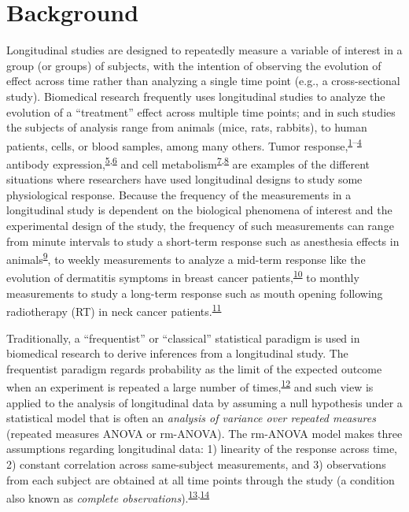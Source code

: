 \documentclass[
]{article}
\begin{document}
\hypertarget{background}{%
\section{Background}\label{background}}

Longitudinal studies are designed to repeatedly measure a variable of interest in a group (or groups) of subjects, with the intention of observing the evolution of effect across time rather than analyzing a single time point (e.g., a cross-sectional study). Biomedical research frequently uses longitudinal studies to analyze the evolution of a ``treatment'' effect across multiple time points; and in such studies the subjects of analysis range from animals (mice, rats, rabbits), to human patients, cells, or blood samples, among many others. Tumor response,\textsuperscript{\protect\hyperlink{ref-roblyer2011}{1}--\protect\hyperlink{ref-demidov2018}{4}} antibody expression,\textsuperscript{\protect\hyperlink{ref-ritter2001}{5},\protect\hyperlink{ref-roth2017}{6}} and cell metabolism\textsuperscript{\protect\hyperlink{ref-jones2018}{7},\protect\hyperlink{ref-skala2010}{8}} are examples of the different situations where researchers have used longitudinal designs to study some physiological response. Because the frequency of the measurements in a longitudinal study is dependent on the biological phenomena of interest and the experimental design of the study, the frequency of such measurements can range from minute intervals to study a short-term response such as anesthesia effects in animals\textsuperscript{\protect\hyperlink{ref-greening2018}{9}}, to weekly measurements to analyze a mid-term response like the evolution of dermatitis symptoms in breast cancer patients,\textsuperscript{\protect\hyperlink{ref-sio2016}{10}} to monthly measurements to study a long-term response such as mouth opening following radiotherapy (RT) in neck cancer patients.\textsuperscript{\protect\hyperlink{ref-kamstra2015}{11}}

Traditionally, a ``frequentist'' or ``classical'' statistical paradigm is used in biomedical research to derive inferences from a longitudinal study. The frequentist paradigm regards probability as the limit of the expected outcome when an experiment is repeated a large number of times,\textsuperscript{\protect\hyperlink{ref-wagenmakers2008}{12}} and such view is applied to the analysis of longitudinal data by assuming a null hypothesis under a statistical model that is often an \emph{analysis of variance over repeated measures} (repeated measures ANOVA or rm-ANOVA). The rm-ANOVA model makes three assumptions regarding longitudinal data: 1) linearity of the response across time, 2) constant correlation across same-subject measurements, and 3) observations from each subject are obtained at all time points through the study (a condition also known as \emph{complete observations}).\textsuperscript{\protect\hyperlink{ref-gueorguieva2004}{13},\protect\hyperlink{ref-schober2018}{14}}
\end{document}
